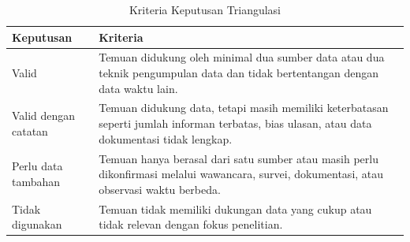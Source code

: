 \begin{table}[!htbp]
    \centering
    \caption{Kriteria Keputusan Triangulasi}
    \label{tab:kriteria-keputusan-triangulasi}
    \footnotesize
    \setlength{\tabcolsep}{4pt}
    \renewcommand{\arraystretch}{0.95}
    \begin{tabularx}{\textwidth}{|Z{3cm}|Y|}
        \toprule
        \textbf{Keputusan} & \textbf{Kriteria} \\ \hline
        \midrule
        Valid & Temuan didukung oleh minimal dua sumber data atau dua teknik pengumpulan data dan tidak bertentangan dengan data waktu lain. \\ \hline
        Valid dengan catatan & Temuan didukung data, tetapi masih memiliki keterbatasan seperti jumlah informan terbatas, bias ulasan, atau data dokumentasi tidak lengkap. \\ \hline
        Perlu data tambahan & Temuan hanya berasal dari satu sumber atau masih perlu dikonfirmasi melalui wawancara, survei, dokumentasi, atau observasi waktu berbeda. \\ \hline
        Tidak digunakan & Temuan tidak memiliki dukungan data yang cukup atau tidak relevan dengan fokus penelitian. \\ \hline
        \bottomrule
    \end{tabularx}
\end{table}
